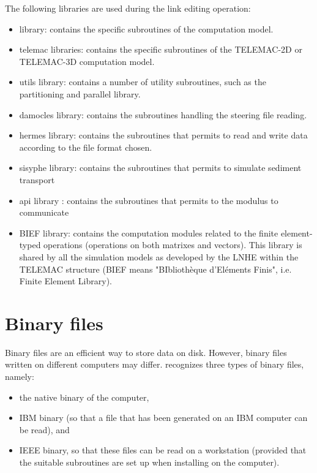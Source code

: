  The following libraries are used during the link editing operation:

\begin{itemize}
\item  \tomawac library: contains the specific subroutines of the \tomawac computation model.

\item  telemac libraries: contains the specific subroutines of the TELEMAC-2D or TELEMAC-3D computation model.

\item  utils library: contains a number of utility subroutines, such as the partitioning and parallel library.

\item  damocles library: contains the subroutines handling the steering file reading.

\item  hermes library: contains the subroutines that permits to read and write data according to the file format chosen.

\item  sisyphe library: contains the subroutines that permits to simulate sediment transport

\item  api library : contains the subroutines that permits to the modulus to communicate

\item  BIEF library: contains the computation modules related to the finite element-typed operations (operations on both matrixes and vectors). This library is shared by all the simulation models as developed by the LNHE within the TELEMAC structure (BIEF means "BIbliothèque d'Eléments Finis", i.e. Finite Element Library).
\end{itemize}


\section{ Binary files }

 Binary files are an efficient way to store data on disk. However, binary files written on different computers may differ. \tomawac recognizes three types of binary files, namely:

\begin{itemize}
\item  the native binary of the computer,

\item  IBM binary (so that a file that has been generated on an IBM computer can be read), and

\item  IEEE binary, so that these files can be read on a workstation (provided that the suitable subroutines are set up when installing \tomawac on the computer).
\end{itemize}

